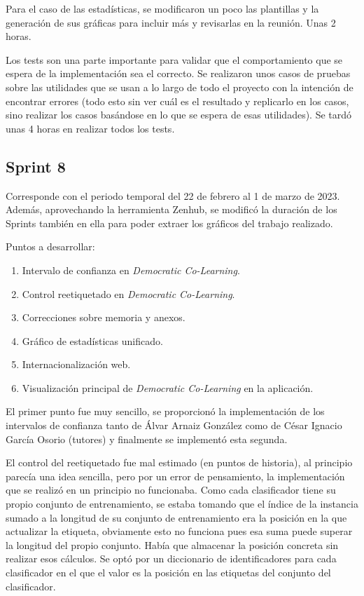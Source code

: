 Para el caso de las estadísticas, se modificaron un poco las plantillas y la
generación de sus gráficas para incluir más y revisarlas en la reunión. Unas 2
horas.

Los tests son una parte importante para validar que el comportamiento que se
espera de la implementación sea el correcto. Se realizaron unos casos de pruebas
sobre las utilidades que se usan a lo largo de todo el proyecto con la intención
de encontrar errores (todo esto sin ver cuál es el resultado y replicarlo en los
casos, sino realizar los casos basándose en lo que se espera de esas
utilidades). Se tardó unas 4 horas en realizar todos los tests.

\subsection{Sprint 8}
Corresponde con el periodo temporal del 22 de febrero al 1 de marzo de 2023.
Además, aprovechando la herramienta Zenhub, se modificó la duración de los
Sprints también en ella para poder extraer los gráficos del trabajo realizado.

Puntos a desarrollar:
\begin{enumerate}
    \item Intervalo de confianza en \textit{Democratic Co-Learning}.
    \item Control reetiquetado en \textit{Democratic Co-Learning}.
    \item Correcciones sobre memoria y anexos.
    \item Gráfico de estadísticas unificado.
    \item Internacionalización web.
    \item Visualización principal de \textit{Democratic Co-Learning} en la aplicación.
\end{enumerate}

El primer punto fue muy sencillo, se proporcionó la implementación de los
intervalos de confianza tanto de Álvar Arnaiz González como de César Ignacio
García Osorio (tutores) y finalmente se implementó esta segunda.

El control del reetiquetado fue mal estimado (en puntos de historia), al
principio parecía una idea sencilla, pero por un error de pensamiento, la
implementación que se realizó en un principio no funcionaba. Como cada
clasificador tiene su propio conjunto de entrenamiento, se estaba tomando que el
índice de la instancia sumado a la longitud de su conjunto de entrenamiento era
la posición en la que actualizar la etiqueta, obviamente esto no funciona pues
esa suma puede superar la longitud del propio conjunto. Había que almacenar la
posición concreta sin realizar esos cálculos. Se optó por un diccionario de
identificadores para cada clasificador en el que el valor es la posición en las
etiquetas del conjunto del clasificador.

